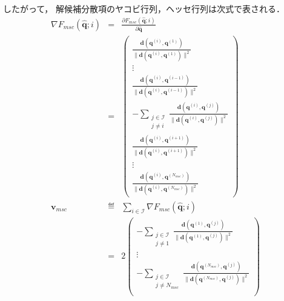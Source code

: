 したがって，
解候補分散項のヤコビ行列，ヘッセ行列は次式で表される．
\begin{subequations}
\begin{eqnarray}
  \nabla F_{\mathit{msc}}(\bm{\hat{q}}; i) &=& \frac{\partial F_{\mathit{msc}}(\bm{\hat{q}}; i)}{\partial \bm{\hat{q}}} \\
  &=&
  \begin{pmatrix}
  \frac{\bm{d}(\bm{q}^{(i)}, \bm{q}^{(1)})}{\| \bm{d}(\bm{q}^{(i)}, \bm{q}^{(1)}) \|^2} \\
  \vdots \\
  \frac{\bm{d}(\bm{q}^{(i)}, \bm{q}^{(i-1)})}{\| \bm{d}(\bm{q}^{(i)}, \bm{q}^{(i-1)}) \|^2} \\
  - \sum_{\substack{j \in \mathcal{I} \\ j \not= i}} \frac{\bm{d}(\bm{q}^{(i)}, \bm{q}^{(j)})}{\| \bm{d}(\bm{q}^{(i)}, \bm{q}^{(j)}) \|^2} \\
  \frac{\bm{d}(\bm{q}^{(i)}, \bm{q}^{(i+1)})}{\| \bm{d}(\bm{q}^{(i)}, \bm{q}^{(i+1)}) \|^2} \\
  \vdots \\
  \frac{\bm{d}(\bm{q}^{(i)}, \bm{q}^{(N_{\mathit{msc}})})}{\| \bm{d}(\bm{q}^{(i)}, \bm{q}^{(N_{\mathit{msc}})}) \|^2}
  \end{pmatrix} \\
  \bm{v}_{\mathit{msc}} &\eqdef&
  \sum_{i \in \mathcal{I}} \nabla F_{\mathit{msc}}(\bm{\hat{q}}; i) \\
  &=&
  2
  \begin{pmatrix}
  - \sum_{\substack{j \in \mathcal{I} \\ j \not= 1}} \frac{\bm{d}(\bm{q}^{(1)}, \bm{q}^{(j)})}{\| \bm{d}(\bm{q}^{(1)}, \bm{q}^{(j)}) \|^2} \\
  \vdots \\
  - \sum_{\substack{j \in \mathcal{I} \\ j \not= N_{\mathit{msc}}}} \frac{\bm{d}(\bm{q}^{(N_{\mathit{msc}})}, \bm{q}^{(j)})}{\| \bm{d}(\bm{q}^{(N_{\mathit{msc}})}, \bm{q}^{(j)}) \|^2} \\
  \end{pmatrix} \label{eq:sqp-msc-dispersion-matrix}
\end{eqnarray}
\end{subequations}
